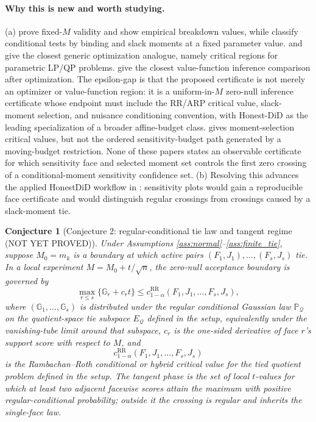 \documentclass[11pt]{article}
\renewcommand{\Pr}{\mathbb{P}}
\theoremstyle{definition}
\theoremstyle{plain}
\newtheorem{conjecture}{Conjecture}
\theoremstyle{remark}
\begin{document}
\paragraph{Why this is new and worth studying.}
(a) \citet{RambachanRoth2023} prove fixed-\(M\) validity and show empirical
breakdown values, while \citet{AndrewsRothPakes2023} classify conditional
tests by binding and slack moments at a fixed parameter value.
\citet{GalNedoma1972} and
\citet{BemporadMorariDuaPistikopoulos2002} give the closest generic
optimization analogue, namely critical regions for parametric LP/QP problems.
\citet{FirpoGalvaoParker2023} give the closest value-function inference
comparison after optimization.  The epsilon-gap is that the proposed
certificate is not merely an optimizer or value-function region: it is a
uniform-in-\(M\) zero-null inference certificate whose endpoint must include
the RR/ARP critical value, slack-moment selection, and nuisance conditioning
convention, with Honest-DiD as the leading specialization of a broader
affine-budget class.  \citet{AndrewsSoares2010} gives moment-selection critical
values, but not the ordered sensitivity-budget path generated by a
moving-budget restriction.  None of these papers states an observable
certificate for which sensitivity face and selected moment set controls the
first zero crossing of a conditional-moment sensitivity confidence set.
(b) Resolving this advances the applied HonestDiD workflow in
\citet{RambachanRoth2023}: sensitivity plots would gain a reproducible
face certificate and would distinguish regular crossings from crossings caused
by a slack-moment tie.

\begin{conjecture}[Conjecture 2: regular-conditional tie law and tangent regime
(NOT YET PROVED)]\label{conj:tie_law}
Under Assumptions \ref{ass:normal}--\ref{ass:finite_tie}, suppose
\(M_0=m_k\) is a boundary at which active pairs
\((F_1,J_1),\ldots,(F_s,J_s)\) tie.  In a local experiment
\(M=M_0+t/\sqrt{n}\), the zero-null acceptance boundary is governed by
\[
\max_{r\le s}\{\mathbb{G}_r+c_r t\}\le c_{1-\alpha}^{\mathrm{RR}}(F_1,J_1,
\ldots,F_s,J_s),
\]
where \((\mathbb{G}_1,\ldots,\mathbb{G}_s)\) is distributed under the regular
conditional Gaussian law \(\Pr_{\mathcal{Q}}\) on the quotient-space tie
subspace \(E_{\mathcal{Q}}\) defined in the setup, equivalently under the
vanishing-tube limit around that subspace,
\(c_r\) is the one-sided derivative of face \(r\)'s support score with
respect to \(M\), and
\[
c_{1-\alpha}^{\mathrm{RR}}(F_1,J_1,\ldots,F_s,J_s)
\]
is the Rambachan--Roth conditional or hybrid critical value for the tied
quotient problem defined in the setup.  The tangent phase is the set of local
\(t\)-values for which at least two adjacent facewise scores attain the
maximum with positive regular-conditional probability; outside it the crossing
is regular and inherits the single-face law.
\end{conjecture}
\end{document}

